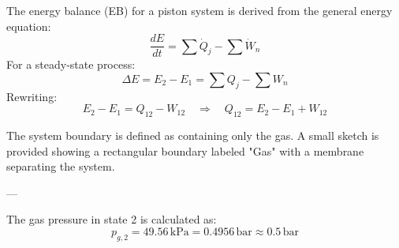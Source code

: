 The energy balance (EB) for a piston system is derived from the general energy equation:  
\[
\frac{dE}{dt} = \sum \dot{Q}_j - \sum \dot{W}_n
\]  
For a steady-state process:  
\[
\Delta E = E_2 - E_1 = \sum Q_j - \sum W_n
\]  
Rewriting:  
\[
E_2 - E_1 = Q_{12} - W_{12} \quad \Rightarrow \quad Q_{12} = E_2 - E_1 + W_{12}
\]  

The system boundary is defined as containing only the gas. A small sketch is provided showing a rectangular boundary labeled "Gas" with a membrane separating the system.

---

The gas pressure in state 2 is calculated as:  
\[
p_{g,2} = 49.56 \, \text{kPa} = 0.4956 \, \text{bar} \approx 0.5 \, \text{bar}
\]